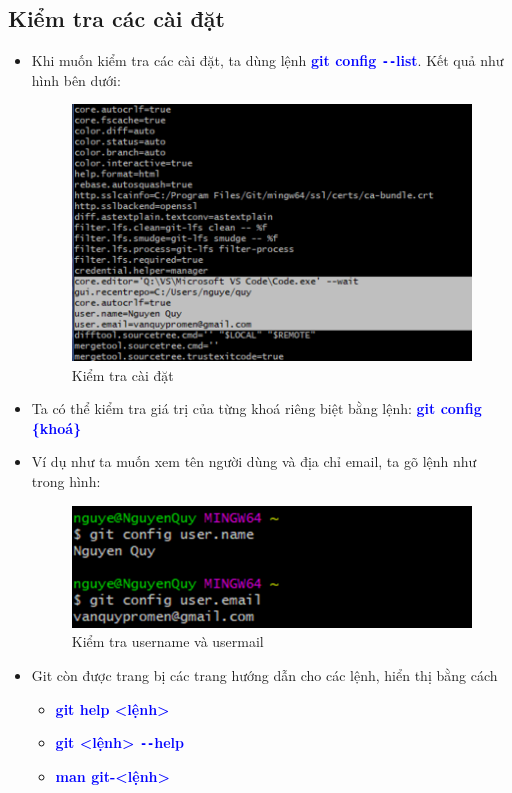 \documentclass[12pt,a4paper]{report}
\begin{document}
\subsection{Kiểm tra các cài đặt}
\begin{itemize}
\item Khi muốn kiểm tra các cài đặt, ta dùng lệnh \textcolor{blue}{\bf git config \texttt{-{}-}list}. Kết quả như hình bên dưới: 
\begin{figure}[!ht]
	\centering
	\includegraphics[width=0.8\linewidth]{screenshot003}
	\caption{Kiểm tra cài đặt}
	\label{fig:screenshot003}
	\end{figure}
\item Ta có thể kiểm tra giá trị của từng khoá riêng biệt bằng lệnh: \textcolor{blue}{\bf git config \{khoá\}}
\item Ví dụ như ta muốn xem tên người dùng và địa chỉ email, ta gõ lệnh như trong hình: 

\begin{figure}[!ht]
	\centering
	\includegraphics[width=0.8\linewidth]{screenshot004}
	\caption{Kiểm tra username và usermail}
	\label{fig:screenshot004}
\end{figure}

\item Git còn được trang bị các trang hướng dẫn cho các lệnh, hiển thị bằng cách
\begin{itemize}
\item \textcolor{blue}{\bf git help <lệnh>}
\item \textcolor{blue}{\bf git <lệnh> \texttt{-{}-}help}
\item \textcolor{blue}{\bf man git-<lệnh>}
\end{itemize}
 \end{itemize}
 
\end{document}
